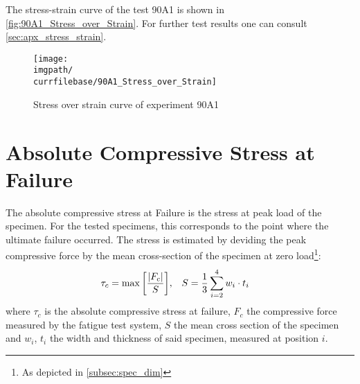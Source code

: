 The stress-strain curve of the test 90A1 is shown in \autoref{fig:90A1_Stress_over_Strain}. For further test results one can consult \autoref{sec:apx_stress_strain}.

\begin{figure}[!ht]
    \texttt{[image: \\imgpath/\\currfilebase/90A1\_Stress\_over\_Strain]}
    \caption{Stress over strain curve of experiment 90A1}
    \label{fig:90A1_Stress_over_Strain}
\end{figure}

\section{Absolute Compressive Stress at Failure}
\label{sec:abs_comp_stress}

The absolute compressive stress at Failure is the stress at peak load of the specimen. For the tested specimens, this corresponds to the point where the ultimate failure occurred. The stress is estimated by deviding the peak compressive force by the mean cross-section of the specimen at zero load\footnote{As depicted in \autoref{subsec:spec_dim}}:
\begin{align*}
    \tau_c &= \max\bqty{\frac{\abs{F_{c}}}{S}}, &S &= \frac{1}{3}\sum\limits_{i=2}^4 w_i\cdot t_i
\end{align*}
where $\tau_c$ is the absolute compressive stress at failure, $F_c$ the compressive force measured by the fatigue test system, $S$ the mean cross section of the specimen and $w_i$, $t_i$ the width and thickness of said specimen, measured at position $i$.

\newcommand{\visfeat}[1]{%
    \raisebox{-0.5ex}{%
        \texttt{[image: \\imgpath/\\currfilebase/visual\_features]}}
}

